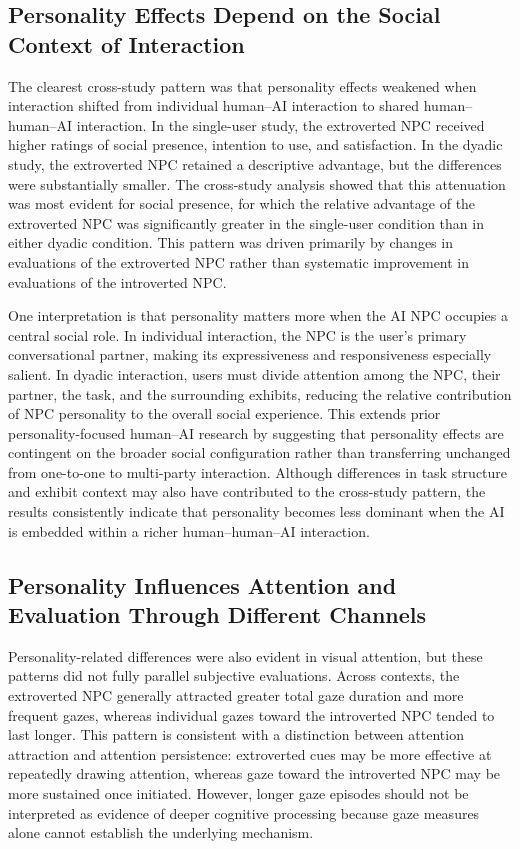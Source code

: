 \documentclass[a4paper,fleqn]{cas-sc}
\begin{document}
\subsection{Personality Effects Depend on the Social Context of Interaction}

The clearest cross-study pattern was that personality effects weakened when interaction shifted from individual human--AI interaction to shared human--human--AI interaction. In the single-user study, the extroverted NPC received higher ratings of social presence, intention to use, and satisfaction. In the dyadic study, the extroverted NPC retained a descriptive advantage, but the differences were substantially smaller. The cross-study analysis showed that this attenuation was most evident for social presence, for which the relative advantage of the extroverted NPC was significantly greater in the single-user condition than in either dyadic condition. This pattern was driven primarily by changes in evaluations of the extroverted NPC rather than systematic improvement in evaluations of the introverted NPC.

One interpretation is that personality matters more when the AI NPC occupies a central social role. In individual interaction, the NPC is the user's primary conversational partner, making its expressiveness and responsiveness especially salient. In dyadic interaction, users must divide attention among the NPC, their partner, the task, and the surrounding exhibits, reducing the relative contribution of NPC personality to the overall social experience. This extends prior personality-focused human--AI research by suggesting that personality effects are contingent on the broader social configuration rather than transferring unchanged from one-to-one to multi-party interaction. Although differences in task structure and exhibit context may also have contributed to the cross-study pattern, the results consistently indicate that personality becomes less dominant when the AI is embedded within a richer human--human--AI interaction.

\subsection{Personality Influences Attention and Evaluation Through Different Channels}

Personality-related differences were also evident in visual attention, but these patterns did not fully parallel subjective evaluations. Across contexts, the extroverted NPC generally attracted greater total gaze duration and more frequent gazes, whereas individual gazes toward the introverted NPC tended to last longer. This pattern is consistent with a distinction between attention attraction and attention persistence: extroverted cues may be more effective at repeatedly drawing attention, whereas gaze toward the introverted NPC may be more sustained once initiated. However, longer gaze episodes should not be interpreted as evidence of deeper cognitive processing because gaze measures alone cannot establish the underlying mechanism.
\end{document}
